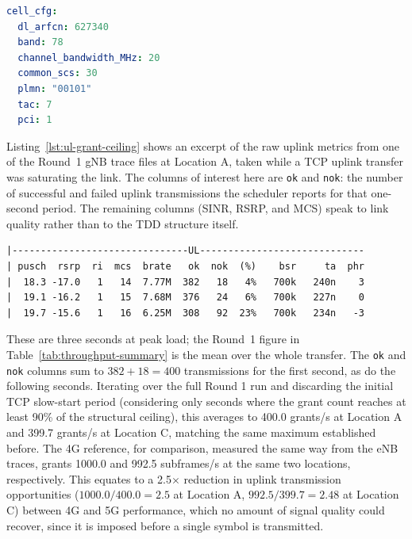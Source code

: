 \begin{lstlisting}[language=yaml,backgroundcolor=\color{gray!20},frame=single,framerule=0.8pt,rulecolor=\color{black},basicstyle=\ttfamily\small,caption={\texttt{gnb.yaml} \texttt{cell\_cfg} block used in Round 1.},label={lst:cell_cfg}]
cell_cfg:
  dl_arfcn: 627340
  band: 78
  channel_bandwidth_MHz: 20
  common_scs: 30
  plmn: "00101"
  tac: 7
  pci: 1
\end{lstlisting}

Listing~\ref{lst:ul-grant-ceiling} shows an excerpt of the raw uplink metrics from one of the Round~1 \gls{gNB} trace files at Location A, taken while a TCP uplink transfer was saturating the link. The columns of interest here are \texttt{ok} and \texttt{nok}: the number of successful and failed uplink transmissions the scheduler reports for that one-second period. The remaining columns (\gls{SINR}, \gls{RSRP}, and \gls{MCS}) speak to link quality rather than to the \gls{TDD} structure itself.

\begin{lstlisting}[backgroundcolor=\color{gray!20},frame=single,framerule=0.8pt,rulecolor=\color{black},basicstyle=\ttfamily\small,columns=fixed,keepspaces=true,caption={Console trace during peak load from the Location A (2\,m) TCP uplink test in Round~1.},label={lst:ul-grant-ceiling}]
|-------------------------------UL-----------------------------
| pusch  rsrp  ri  mcs  brate   ok  nok  (%)    bsr     ta  phr
|  18.3 -17.0   1   14  7.77M  382   18   4%   700k   240n    3
|  19.1 -16.2   1   15  7.68M  376   24   6%   700k   227n    0
|  19.7 -15.6   1   16  6.25M  308   92  23%   700k   234n   -3
\end{lstlisting}

These are three seconds at peak load; the Round~1 figure in Table~\ref{tab:throughput-summary} is the mean over the whole transfer. The \texttt{ok} and \texttt{nok} columns sum to $382+18=400$ transmissions for the first second, as do the following seconds. Iterating over the full Round 1 run and discarding the initial TCP slow-start period (considering only seconds where the grant count reaches at least 90\% of the structural ceiling), this averages to 400.0 grants/s at Location A and 399.7 grants/s at Location C, matching the same maximum established before. The 4G reference, for comparison, measured the same way from the \gls{eNB} traces, grants 1000.0 and 992.5 subframes/s at the same two locations, respectively. This equates to a 2.5$\times$ reduction in uplink transmission opportunities ($1000.0/400.0 = 2.5$ at Location A, $992.5/399.7 = 2.48$ at Location C) between 4G and 5G performance, which no amount of signal quality could recover, since it is imposed before a single symbol is transmitted.

